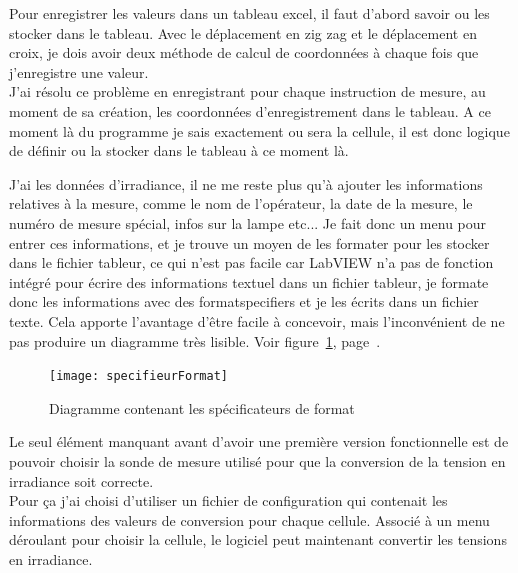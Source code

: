 \documentclass[12pt]{article}
\begin{document}
Pour enregistrer les valeurs dans un tableau excel, il faut d'abord savoir ou les stocker dans le tableau.
Avec le déplacement en zig zag et le déplacement en croix, je dois avoir deux méthode de calcul de coordonnées à chaque fois que j'enregistre une valeur.\\
J'ai résolu ce problème en enregistrant pour chaque instruction de mesure, au moment de sa création, les coordonnées d'enregistrement dans le tableau.
A ce moment là du programme je sais exactement ou sera la cellule, il est donc logique de définir ou la stocker dans le tableau à ce moment là.


J'ai les données d'irradiance, il ne me reste plus qu'à ajouter les informations relatives à la mesure, comme le nom de l'opérateur, la date de la mesure, le numéro de mesure spécial, infos sur la lampe etc...
Je fait donc un menu pour entrer ces informations, et je trouve un moyen de les formater pour les stocker dans le fichier tableur, ce qui n'est pas facile car LabVIEW n'a pas de fonction intégré pour écrire des informations textuel dans un fichier tableur, je formate donc les informations avec des \glspl{formatspecifier} et je les écrits dans un fichier texte.
Cela apporte l'avantage d'être facile à concevoir, mais l'inconvénient de ne pas produire un diagramme très lisible.
Voir figure~\ref{fig:specifieurFormat}, page~\pageref{fig:specifieurFormat}.

\begin{figure}[h]
	\centering
	\texttt{[image: specifieurFormat]}
	\caption{Diagramme contenant les spécificateurs de format}
	\label{fig:specifieurFormat}
\end{figure}

Le seul élément manquant avant d'avoir une première version fonctionnelle est de pouvoir choisir la sonde de mesure utilisé pour que la conversion de la tension en irradiance soit correcte.\\
Pour ça j'ai choisi d'utiliser un fichier de configuration qui contenait les informations des valeurs de conversion pour chaque cellule. Associé à un menu déroulant pour choisir la cellule, le logiciel peut maintenant convertir les tensions en irradiance.
\end{document}

